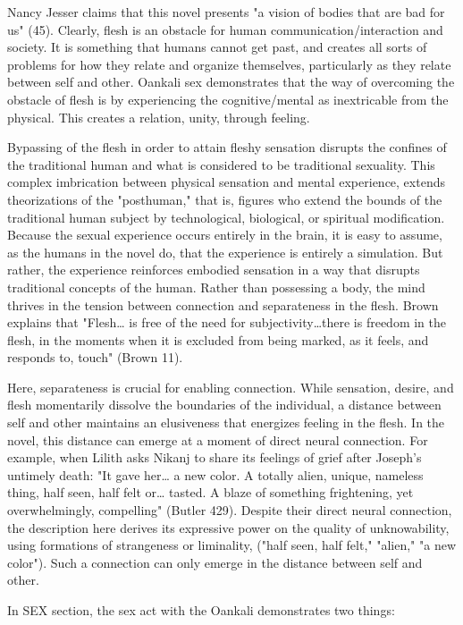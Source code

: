 \documentclass[11pt]{article}
\begin{document}
\begin{enumerate}
Nancy Jesser claims that this novel presents "a vision of bodies that
are bad for us" (45). Clearly, flesh is an obstacle for human
communication/interaction and society. It is something that humans
cannot get past, and creates all sorts of problems for how they relate
and organize themselves, particularly as they relate between self and
other. Oankali sex demonstrates that the way of overcoming the
obstacle of flesh is by experiencing the cognitive/mental as
inextricable from the physical. This creates a relation, unity,
through feeling.

Bypassing of the flesh in order to attain fleshy sensation disrupts
the confines of the traditional human and what is considered to be
traditional sexuality. This complex imbrication between physical
sensation and mental experience, extends theorizations of the
"posthuman," that is, figures who extend the bounds of the traditional
human subject by technological, biological, or spiritual
modification. Because the sexual experience occurs entirely in the
brain, it is easy to assume, as the humans in the novel do, that the
experience is entirely a simulation. But rather, the experience
reinforces embodied sensation in a way that disrupts traditional
concepts of the human. Rather than possessing a body, the mind thrives
in the tension between connection and separateness in the flesh. Brown
explains that "Flesh… is free of the need for subjectivity\ldots{}there is
freedom in the flesh, in the moments when it is excluded from being
marked, as it feels, and responds to, touch" (Brown 11).

Here, separateness is crucial for enabling connection. While
sensation, desire, and flesh momentarily dissolve the boundaries of
the individual, a distance between self and other maintains an
elusiveness that energizes feeling in the flesh. In the novel, this
distance can emerge at a moment of direct neural connection. For
example, when Lilith asks Nikanj to share its feelings of grief after
Joseph's untimely death: "It gave her\ldots{} a new color. A totally alien,
unique, nameless thing, half seen, half felt or\ldots{} tasted. A blaze of
something frightening, yet overwhelmingly, compelling" (Butler
429). Despite their direct neural connection, the description here
derives its expressive power on the quality of unknowability, using
formations of strangeness or liminality, ("half seen, half felt,"
"alien," "a new color"). Such a connection can only emerge in the
distance between self and other.

In SEX section, the sex act with the Oankali demonstrates two things: 


\end{enumerate}
\end{document}
